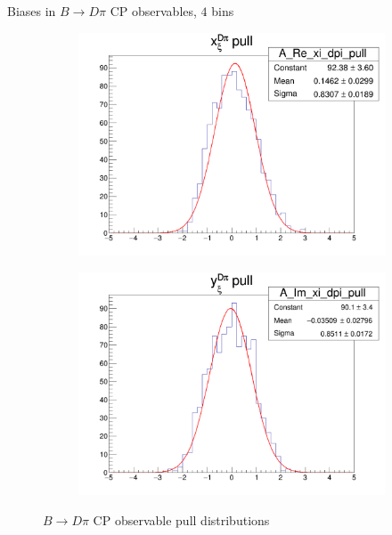 \documentclass{beamer}
\begin{document}
\begin{frame}{Biases in $B\to D\pi$ CP observables, $4$ bins}
  \begin{figure}
    \centering
    \vspace{-0.2cm}
    \begin{subfigure}{0.5\textwidth}
      \includegraphics[width = 1.0\textwidth]{A_Re_xi_dpi_4Bins_pull.png}
    \end{subfigure}%
    \begin{subfigure}{0.5\textwidth}
      \includegraphics[width = 1.0\textwidth]{A_Im_xi_dpi_4Bins_pull.png}
    \end{subfigure}
    \caption{$B\to D\pi$ CP observable pull distributions}
  \end{figure}
\end{frame}
\end{document}
